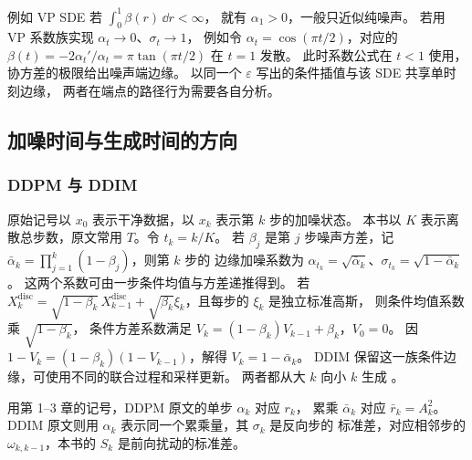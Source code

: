 例如 VP SDE 若 \(\int_0^1\beta(r)\,\dd r<\infty\)，
就有 \(\alpha_1>0\)，一般只近似纯噪声。
若用 VP 系数族实现 \(\alpha_t\to0\)、\(\sigma_t\to1\)，
例如令 \(\alpha_t=\cos(\pi t/2)\)，对应的
\(\beta(t)=-2\alpha_t'/\alpha_t=\pi\tan(\pi t/2)\) 在 \(t=1\) 发散。
此时系数公式在 \(t<1\) 使用，协方差的极限给出噪声端边缘。
以同一个 \(\varepsilon\) 写出的条件插值与该 SDE 共享单时刻边缘，
两者在端点的路径行为需要各自分析。

\subsection{加噪时间与生成时间的方向}

\begin{center}
\end{center}

\subsubsection*{DDPM 与 DDIM}
    原始记号以 \(x_0\) 表示干净数据，以 \(x_k\) 表示第 \(k\) 步的加噪状态。
    本书以 \(K\) 表示离散总步数，原文常用 \(T\)。令 \(t_k=k/K\)。
    若 \(\beta_j\) 是第 \(j\) 步噪声方差，记
    \(\bar\alpha_k=\prod_{j=1}^k(1-\beta_j)\)，则第 \(k\) 步的
    边缘加噪系数为
    \(\alpha_{t_k}=\sqrt{\bar\alpha_k}\)、\(\sigma_{t_k}=\sqrt{1-\bar\alpha_k}\)。
    这两个系数可由一步条件均值与方差递推得到。
    若 \(X_k^{\mathrm{disc}}=\sqrt{1-\beta_k}\,X_{k-1}^{\mathrm{disc}}
      +\sqrt{\beta_k}\xi_k\)，且每步的 \(\xi_k\) 是独立标准高斯，
    则条件均值系数乘 \(\sqrt{1-\beta_k}\)，
    条件方差系数满足 \(V_k=(1-\beta_k)V_{k-1}+\beta_k\)，\(V_0=0\)。
    因 \(1-V_k=(1-\beta_k)(1-V_{k-1})\)，解得 \(V_k=1-\bar\alpha_k\)。
    DDIM 保留这一族条件边缘，可使用不同的联合过程和采样更新。
    两者都从大 \(k\) 向小 \(k\) 生成 \cite{ho2020ddpm,song2021ddim}。


    用第 1--3 章的记号，DDPM 原文的单步 \(\alpha_k\) 对应 \(r_k\)，
    累乘 \(\bar\alpha_k\) 对应 \(\bar r_k=A_k^2\)。
    DDIM 原文则用 \(\alpha_k\) 表示同一个累乘量，其 \(\sigma_k\) 是反向步的
    标准差，对应相邻步的 \(\omega_{k,k-1}\)，本书的 \(S_k\) 是前向扰动的标准差。


